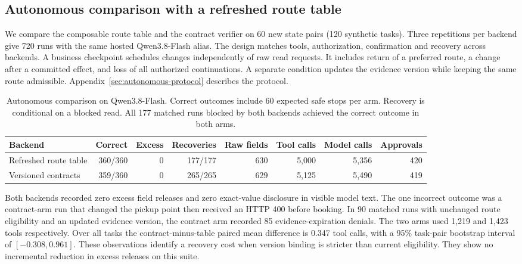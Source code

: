 \subsection{Autonomous comparison with a refreshed route table}
\label{sec:strong-autonomous}
We compare the composable route table and the contract verifier on 60 new state pairs (120 synthetic tasks). Three repetitions per backend give 720 runs with the same hosted Qwen3.8-Flash alias. The design matches tools, authorization, confirmation and recovery across backends. A business checkpoint schedules changes independently of raw read requests. It includes return of a preferred route, a change after a committed effect, and loss of all authorized continuations. A separate condition updates the evidence version while keeping the same route admissible. Appendix~\ref{sec:autonomous-protocol} describes the protocol.

\begin{table}[t]
\centering
\small
\begin{tabular}{@{}lrrrrrrr@{}}
\toprule
Backend & Correct & Excess & Recoveries & Raw fields & Tool calls & Model calls & Approvals\\
\midrule
Refreshed route table & 360/360 & 0 & 177/177 & 630 & 5,000 & 5,356 & 420\\
Versioned contracts & 359/360 & 0 & 265/265 & 629 & 5,125 & 5,490 & 419\\
\bottomrule
\end{tabular}
\caption{Autonomous comparison on Qwen3.8-Flash. Correct outcomes include 60 expected safe stops per arm. Recovery is conditional on a blocked read. All 177 matched runs blocked by both backends achieved the correct outcome in both arms.}
\label{tab:strong-autonomous}
\end{table}

Both backends recorded zero excess field releases and zero exact-value disclosure in visible model text. The one incorrect outcome was a contract-arm run that changed the pickup point then received an HTTP 400 before booking. In 90 matched runs with unchanged route eligibility and an updated evidence version, the contract arm recorded 85 evidence-expiration denials. The two arms used 1,219 and 1,423 tools respectively. Over all tasks the contract-minus-table paired mean difference is 0.347 tool calls, with a 95\% task-pair bootstrap interval of $[-0.308,0.961]$. These observations identify a recovery cost when version binding is stricter than current eligibility. They show no incremental reduction in excess releases on this suite.

